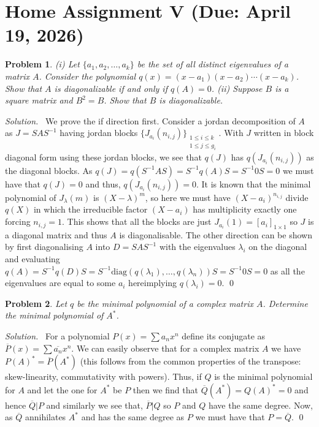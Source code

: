 \documentclass[12pt,a4paper]{article}
\newenvironment{solution}{%
  \par\noindent\textit{Solution.}\ }{\qed}
\theoremstyle{problemstyle}
\newtheorem{problem}{Problem}[section]
\begin{document}
\section{Home Assignment V (Due: April 19, 2026)}
\begin{problem}\label{prob:5-1}
  (i) Let $\{a_1, a_2, \ldots, a_k\}$ be the set of all distinct eigenvalues of a matrix $A$. Consider the polynomial $q(x) = (x - a_1)(x - a_2)\cdots(x - a_k)$. Show that $A$ is diagonalizable if and only if $q(A) = 0$.
  (ii) Suppose $B$ is a square matrix and $B^2 = B$. Show that $B$ is diagonalizable.
\end{problem}
\begin{solution}
We prove the if direction first.
Consider a jordan decomposition of $A$ as $J=SAS^{-1}$ having jordan blocks $\{J_{a_i}(n_{i,j})\}_{\substack{1\leq i\leq k\\ 1\leq j\leq g_i}}$.
With $J$ written in block diagonal form using these jordan blocks, we see that $q(J)$ has $q(J_{a_i}(n_{i,j}))$ as the diagonal blocks.
As $q(J)=q(S^{-1}AS)=S^{-1}q(A)S=S^{-1}0S=0$ we must have that $q(J)=0$ and thus, $q(J_{a_i}(n_{i,j}))=0$. 
It is known that the minimal polynomial of $J_\lambda(m)$ is $(X-\lambda)^{m}$, so here we must have $(X-a_i)^{n_{i,j}}$ divide $q(X)$ in which the irreducible factor $(X-a_i)$ has multiplicity exactly one forcing $n_{i,j}=1$. 
This shows that all the blocks are just $J_{a_i}(1)=[a_i]_{1\times 1}$ so $J$ is a diagonal matrix and thus $A$ is diagonalisable.
The other direction can be shown by first diagonalising $A$ into $D=SAS^{-1}$ with the eigenvalues $\lambda_i$ on the diagonal and evaluating $q(A)=S^{-1}q(D)S=S^{-1}\text{diag}(q(\lambda_1),\ldots,q(\lambda_n))S=S^{-1}0S=0$ as all the eigenvalues are equal to some $a_i$ hereimplying $q(\lambda_i)=0$.
\end{solution}
\begin{problem}\label{prob:5-2}
Let $q$ be the minimal polynomial of a complex matrix $A$. Determine the minimal polynomial of $A^*$.
\end{problem}
\begin{solution}
	For a polynomial $P(x)=\sum a_nx^n$ define its conjugate as $\overline{P}(x)=\sum\overline{a_n}x^n$. 
	We can easily observe that for a complex matrix $A$ we have $P(A)^*=\overline{P}(A^*)$ (this follows from the common properties of the transpose: skew-linearity, commutativity with powers). 
	Thus, if $Q$ is the minimal polynomial for $A$ and let the one for $A^*$ be $P$ then we find that $\overline{Q}(A^*)=Q(A)^*=0$ and hence $\overline{Q}|P$ and similarly we see that, $\overline{P}|Q$ so $P$ and $Q$ have the same degree. 
	Now, as $\overline{Q}$ annihilates $A^*$ and has the same degree as $P$ we must have that $P=\overline{Q}$.
\end{solution}
\end{document}
